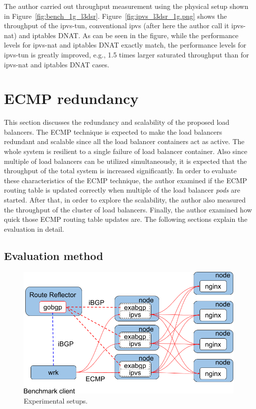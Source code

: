 The author carried out throughput measurement using the physical setup shown in Figure~\ref{fig:bench_1g_l3dsr}.
Figure~\ref{fig:ipvs_l3dsr_1g.png} shows the throughput of the ipvs-tun, conventional ipvs (after here the author call it ipvs-nat) and iptables DNAT.
As can be seen in the figure, while the performance levels for ipvs-nat and iptables DNAT exactly match, the performance levels for ipvs-tun is greatly improved, e.g., 1.5 times larger saturated throughput than for ipvs-nat and iptables DNAT cases.

\FloatBarrier

\section{ECMP redundancy}

This section discusses the redundancy and scalability of the proposed load balancers.
The ECMP technique is expected to make the load balancers redundant and scalable since all the load balancer containers act as active.
The whole system is resilient to a single failure of load balancer container.
Also since multiple of load balancers can be utilized simultaneously, it is expected that the throughput of the total system is increased significantly.
In order to evaluate these characteristics of the ECMP technique,
the author examined if the ECMP routing table is updated correctly when multiple of the load balancer {\em pods} are started.
After that, in order to explore the scalability, the author also measured the throughput of the cluster of load balancers.
Finally, the author examined how quick those ECMP routing table updates are.
The following sections explain the evaluation in detail.

\subsection{Evaluation method}

\begin{figure}[b]
  \centering
    \includegraphics[width=0.9\columnwidth]{Figs/lb_ecmp_schem}
    \caption{Experimental setups.}
    \label{fig:lb_ecmp_schem}
\end{figure}

